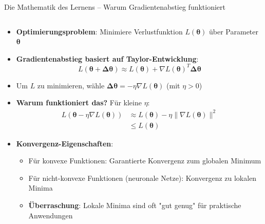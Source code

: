 \documentclass[aspectratio=1610, xcolor=dvipsnames, 9pt]{beamer}
\begin{document}
\begin{frame}{Die Mathematik des Lernens -- Warum Gradientenabstieg funktioniert}
  \begin{columns}
    \begin{column}{1\textwidth}
      \begin{itemize}
        \item \textbf{Optimierungsproblem}: Minimiere Verlustfunktion $L(\boldsymbol{\theta})$ über Parameter $\boldsymbol{\theta}$
        \item \textbf{Gradientenabstieg basiert auf Taylor-Entwicklung}:
        \begin{equation}
          L(\boldsymbol{\theta} + \boldsymbol{\Delta\theta}) \approx L(\boldsymbol{\theta}) + \nabla L(\boldsymbol{\theta})^T \boldsymbol{\Delta\theta}
        \end{equation}
        \item Um $L$ zu minimieren, wähle $\boldsymbol{\Delta\theta} = -\eta \nabla L(\boldsymbol{\theta})$ (mit $\eta > 0$)
        \item \textbf{Warum funktioniert das?} Für kleine $\eta$:
        \begin{align}
          L(\boldsymbol{\theta} - \eta \nabla L(\boldsymbol{\theta})) &\approx L(\boldsymbol{\theta}) - \eta \|\nabla L(\boldsymbol{\theta})\|^2 \\
          &\leq L(\boldsymbol{\theta})
        \end{align}
        \item \textbf{Konvergenz-Eigenschaften}:
        \begin{itemize}
          \item Für konvexe Funktionen: Garantierte Konvergenz zum globalen Minimum
          \item Für nicht-konvexe Funktionen (neuronale Netze): Konvergenz zu lokalen Minima
          \item \textbf{Überraschung}: Lokale Minima sind oft "gut genug" für praktische Anwendungen
        \end{itemize}
      \end{itemize}
    \end{column}
  \end{columns}
\end{frame}
\end{document}
